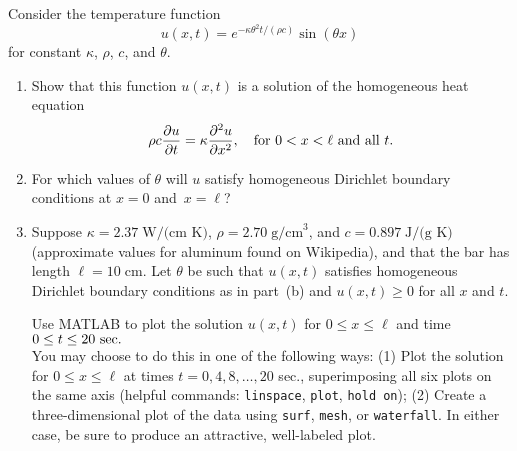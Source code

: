 Consider the temperature function
\[ u(x,t) = e^{-\kappa \theta^2 t/(\rho c)} \sin(\theta x) \]
for constant $\kappa$, $\rho$, $c$, and $\theta$.
\begin{enumerate}
\item Show that this function $u(x,t)$ is a solution of the homogeneous heat equation
 \[  \rho c {{\partial} u \over {\partial} t} = \kappa {{\partial}^2 u\over {\partial}x^2}, 
       \quad \mbox{for $0<x<\ell$ and all $t$.}\]

\item For which values of $\theta$ will $u$ satisfy 
      homogeneous Dirichlet boundary conditions at $x=0$ and~$x=\ell$?

\item Suppose $\kappa = 2.37\;\mbox{W/(cm K)}$,
      $\rho = 2.70\;\mbox{g/cm}^3$, and $c = 0.897\; \mbox{J/(g K)}$
      (approximate values for aluminum found on Wikipedia),
      and that the bar has length $\ell = 10\;\mbox{cm}$.
      Let $\theta$ be such that $u(x,t)$ satisfies
      homogeneous Dirichlet boundary conditions as in part~(b)
      and $u(x,t)\ge 0$ for all $x$ and $t$.
 
\vspace*{.25em} 
      Use MATLAB to plot the solution $u(x,t)$ for $0\le x\le \ell$
      and time $0\le t\le 20~{\rm sec}.$\\
      You may choose to do this in one of the following ways:
        (1) Plot the solution for $0\le x\le \ell$ at times
         $t = 0, 4, 8, \ldots, 20$ sec., superimposing all
         six plots on the same axis (helpful commands:
         \verb|linspace|, \verb|plot|, \verb|hold on|);
        (2) Create a three-dimensional plot of the data 
         using \verb|surf|, \verb|mesh|, or \verb|waterfall|.
        In either case, be sure to produce an attractive,
        well-labeled plot.

\end{enumerate}




